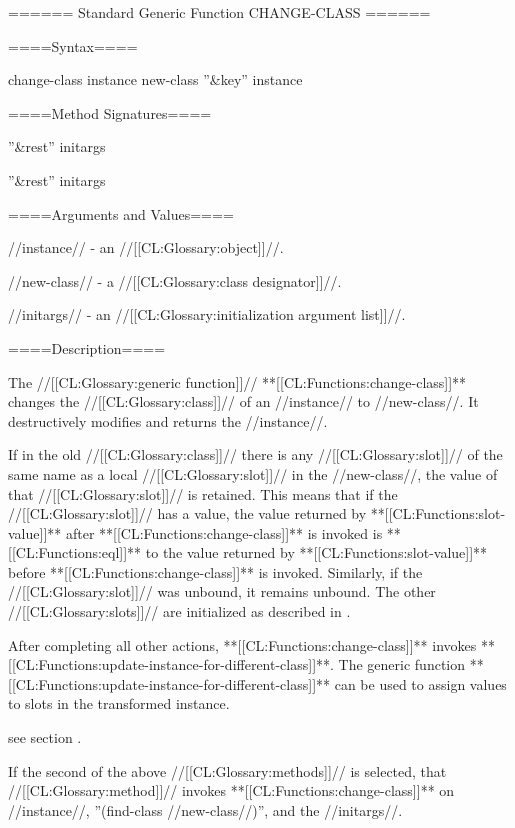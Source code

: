 ====== Standard Generic Function CHANGE-CLASS ======

====Syntax====


\DefgenWithValues change-class {instance new-class ''&key'' {\allowotherkeys}} {instance}

====Method Signatures====


 {  ''&rest'' initargs}

 {  ''&rest'' initargs}

====Arguments and Values====

//instance// - an //[[CL:Glossary:object]]//.

//new-class// - a //[[CL:Glossary:class designator]]//.


//initargs// - an //[[CL:Glossary:initialization argument list]]//.

====Description====

The //[[CL:Glossary:generic function]]// **[[CL:Functions:change-class]]** changes the //[[CL:Glossary:class]]// of an //instance// to //new-class//. It destructively modifies and returns the //instance//.

If in the old //[[CL:Glossary:class]]// there is any //[[CL:Glossary:slot]]// of the same name as a local //[[CL:Glossary:slot]]// in the //new-class//, the value of that //[[CL:Glossary:slot]]// is retained. This means that if the //[[CL:Glossary:slot]]// has a value, the value returned by **[[CL:Functions:slot-value]]** after **[[CL:Functions:change-class]]** is invoked is **[[CL:Functions:eql]]** to the value returned by **[[CL:Functions:slot-value]]** before **[[CL:Functions:change-class]]** is invoked. Similarly, if the //[[CL:Glossary:slot]]// was unbound, it remains unbound. The other //[[CL:Glossary:slots]]// are initialized as described in \secref\ChangingInstanceClass.

After completing all other actions, **[[CL:Functions:change-class]]** invokes **[[CL:Functions:update-instance-for-different-class]]**. The generic function **[[CL:Functions:update-instance-for-different-class]]** can be used to assign values to slots in the transformed instance.

see section {\secref\InitNewLocalSlots}.



If the second of the above //[[CL:Glossary:methods]]// is selected, that //[[CL:Glossary:method]]// invokes **[[CL:Functions:change-class]]** on //instance//, ''(find-class //new-class//)'', and the //initargs//.



